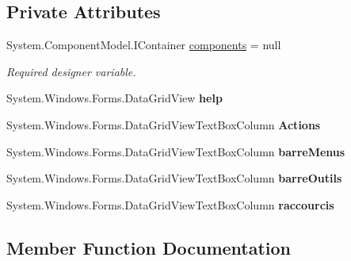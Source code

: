 \subsection*{Private Attributes}
\begin{DoxyCompactItemize}
\item 
System.\+Component\+Model.\+I\+Container \hyperlink{class_interface_graphique_1_1_aide_a2f9eae78723058f9ba1532841f098414}{components} = null
\begin{DoxyCompactList}\small\item\em Required designer variable. \end{DoxyCompactList}\item 
System.\+Windows.\+Forms.\+Data\+Grid\+View {\bfseries help}\hypertarget{class_interface_graphique_1_1_aide_aa41ccddce54b888364c05aadbbaa2fdc}{}\label{class_interface_graphique_1_1_aide_aa41ccddce54b888364c05aadbbaa2fdc}

\item 
System.\+Windows.\+Forms.\+Data\+Grid\+View\+Text\+Box\+Column {\bfseries Actions}\hypertarget{class_interface_graphique_1_1_aide_a1c90796b3509c9e0f9adad5932aa45d2}{}\label{class_interface_graphique_1_1_aide_a1c90796b3509c9e0f9adad5932aa45d2}

\item 
System.\+Windows.\+Forms.\+Data\+Grid\+View\+Text\+Box\+Column {\bfseries barre\+Menus}\hypertarget{class_interface_graphique_1_1_aide_af421d01c2c9ebb960fc10947c321e3aa}{}\label{class_interface_graphique_1_1_aide_af421d01c2c9ebb960fc10947c321e3aa}

\item 
System.\+Windows.\+Forms.\+Data\+Grid\+View\+Text\+Box\+Column {\bfseries barre\+Outils}\hypertarget{class_interface_graphique_1_1_aide_ae7b34ff0ac70303d4c3430364ed13b87}{}\label{class_interface_graphique_1_1_aide_ae7b34ff0ac70303d4c3430364ed13b87}

\item 
System.\+Windows.\+Forms.\+Data\+Grid\+View\+Text\+Box\+Column {\bfseries raccourcis}\hypertarget{class_interface_graphique_1_1_aide_ae36aba7dfe77dd8cb6087867e5df51c8}{}\label{class_interface_graphique_1_1_aide_ae36aba7dfe77dd8cb6087867e5df51c8}

\end{DoxyCompactItemize}


\subsection{Member Function Documentation}
